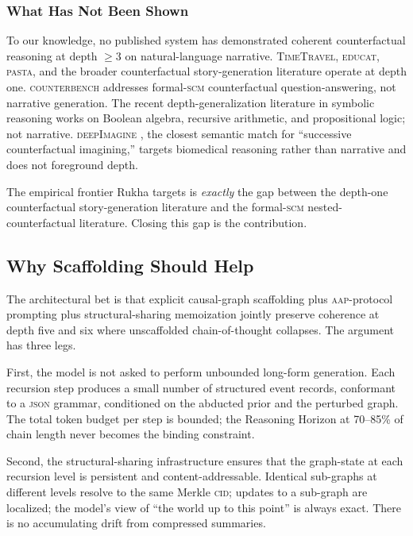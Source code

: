 \documentclass[11pt]{article}
\theoremstyle{rukha}
\begin{document}
\subsubsection{What Has Not Been Shown}

To our knowledge, no published system has demonstrated coherent
counterfactual reasoning at depth $\geq 3$ on natural-language narrative.
\textsc{TimeTravel}, \textsc{educat}, \textsc{pasta}, and the broader
counterfactual story-generation literature operate at depth one.
\textsc{counterbench} addresses formal-\textsc{scm} counterfactual
question-answering, not narrative generation. The recent depth-generalization
literature in symbolic reasoning \cite{depthgeneralization} works on
Boolean algebra, recursive arithmetic, and propositional logic; not
narrative. \textsc{deepImagine} \cite{deepimagine}, the closest semantic
match for ``successive counterfactual imagining,'' targets biomedical
reasoning rather than narrative and does not foreground depth.

The empirical frontier Rukha targets is \emph{exactly} the gap between
the depth-one counterfactual story-generation literature and the
formal-\textsc{scm} nested-counterfactual literature. Closing this gap
is the contribution.

\subsection{Why Scaffolding Should Help}

The architectural bet is that explicit causal-graph scaffolding plus
\textsc{aap}-protocol prompting plus structural-sharing memoization
jointly preserve coherence at depth five and six where unscaffolded
chain-of-thought collapses. The argument has three legs.

First, the model is not asked to perform unbounded long-form
generation. Each recursion step produces a small number of structured
event records, conformant to a \textsc{json} grammar, conditioned on the
abducted prior and the perturbed graph. The total token budget per step
is bounded; the Reasoning Horizon at \mbox{70–85\%} of chain length never
becomes the binding constraint.

Second, the structural-sharing infrastructure ensures that the
graph-state at each recursion level is persistent and content-addressable.
Identical sub-graphs at different levels resolve to the same Merkle
\textsc{cid}; updates to a sub-graph are localized; the model's view of
``the world up to this point'' is always exact. There is no accumulating
drift from compressed summaries.
\end{document}

